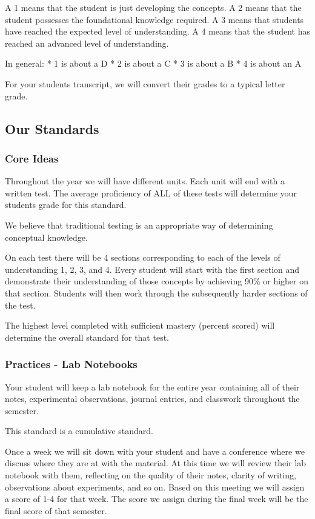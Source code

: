 \documentclass[14pt, fleqn, paper=letter, oneside]{scrartcl}
\begin{document}
\begin{multicols}{2}
A 1 means that the student is just developing the concepts.
A 2 means that the student possesses the foundational knowledge required.
A 3 means that students have reached the expected level of understanding.
A 4 means that the student has reached an advanced level of understanding.

In general:
  * 1 is about a D
  * 2 is about a C
  * 3 is about a B
  * 4 is about an A

For your students transcript, we will convert their grades to a typical letter grade.

\subsection*{Our Standards}
\subsubsection*{Core Ideas}
Throughout the year we will have different units.
Each unit will end with a written test.
The average proficiency of ALL of these tests will determine your students grade for this standard.

We believe that traditional testing is an appropriate way of determining conceptual knowledge.

On each test there will be 4 sections corresponding to each of the levels of understanding 1, 2, 3, and 4.
Every student will start with the first section and demonstrate their understanding of those concepts by achieving 90\% or higher on that section.
Students will then work through the subsequently harder sections of the test.

The highest level completed with sufficient mastery (percent scored) will determine the overall standard for that test.

\subsubsection*{Practices - Lab Notebooks}
Your student will keep a lab notebook for the entire year containing all of their notes, experimental observations, journal entries, and classwork throughout the semester.

This standard is a cumulative standard.

Once a week we will sit down with your student and have a conference where we discuss where they are at with the material.
At this time we will review their lab notebook with them, reflecting on the quality of their notes, clarity of writing, observations about experiments, and so on.
Based on this meeting we will assign a score of 1-4 for that week.
The score we assign during the final week will be the final score of that semester.


\end{multicols}
\end{document}
